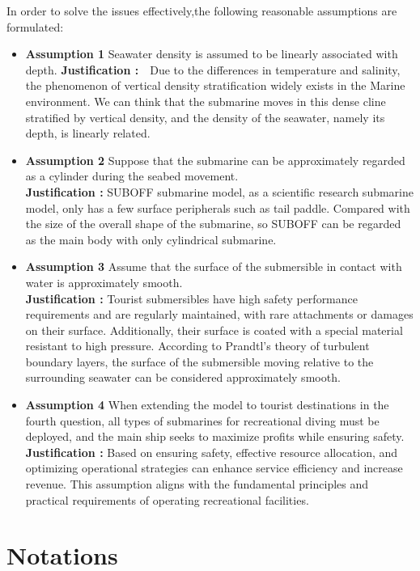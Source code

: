 \documentclass{mcmthesis}  %
\begin{document}
In order to solve the issues effectively,the following reasonable assumptions are formulated:
\begin{itemize}  %

\item\textbf{Assumption 1 }
Seawater density is assumed to be linearly associated with depth.
\textbf{Justification :}\ \ Due to the differences in temperature and salinity, the phenomenon of vertical density stratification widely exists in the Marine environment. We can think that the submarine moves in this dense cline stratified by vertical density, and the density of the seawater, namely its depth, is linearly related.

\item\textbf{Assumption 2 }
Suppose that the submarine can be approximately regarded as a cylinder during the seabed movement.\\
\textbf{Justification : }
SUBOFF submarine model, as a scientific research submarine model, only has a few surface peripherals such as tail paddle. Compared with the size of the overall shape of the submarine, so SUBOFF can be regarded as the main body with only cylindrical submarine.
\item\textbf{Assumption 3 }
Assume that the surface of the submersible in contact with water is approximately smooth.\\
\textbf{Justification : }
Tourist submersibles have high safety performance requirements and are regularly maintained, with rare attachments or damages on their surface. Additionally, their surface is coated with a special material resistant to high pressure. According to Prandtl's theory of turbulent boundary layers, the surface of the submersible moving relative to the surrounding seawater can be considered approximately smooth. 
\item\textbf{Assumption 4 }
When extending the model to tourist destinations in the fourth question, all types of submarines for recreational diving must be deployed, and the main ship seeks to maximize profits while ensuring safety.\\
\textbf{Justification : }
 Based on ensuring safety, effective resource allocation, and optimizing operational strategies can enhance service efficiency and increase revenue. This assumption aligns with the fundamental principles and practical requirements of operating recreational facilities.
\end{itemize}  %


\section{Notations}
\end{document}
